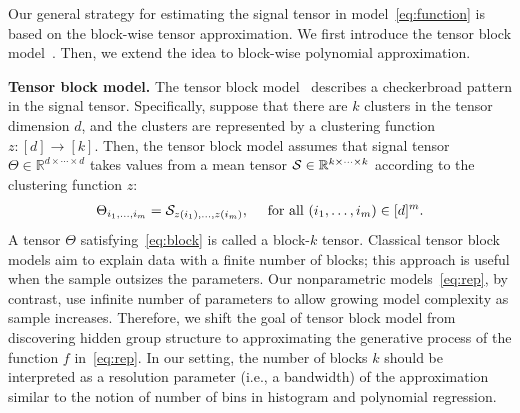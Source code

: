 \documentclass{article}
\theoremstyle{definition}
\begin{document}
Our general strategy for estimating the signal tensor in model~\eqref{eq:function} is based on the block-wise tensor approximation. We first introduce the tensor block model~\citep{han2020exact}. Then, we extend the idea to block-wise polynomial approximation.


{\bf Tensor block model.} The tensor block model~\citep{han2020exact} describes a checkerbroad pattern in the signal tensor. Specifically, suppose that there are $k$ clusters in the tensor dimension $d$, and the clusters are represented by a clustering function $z\colon [d]\rightarrow  [k]$. Then, the tensor block model assumes that signal tensor $\Theta\in\mathbb{R}^{d\times \cdots \times d}$ takes values from a mean tensor $\mathcal{S}\in\mathbb{R}^{k\times\cdots\times k}$ according to the clustering function $z$:
\begin{align}\label{eq:block}
    \Theta_{i_1,\ldots,i_m} = \mathcal{S}_{z(i_1),\ldots,z(i_m)}, \quad \text{ for all } (i_1,\ldots,i_m)\in[d]^m.
\end{align}
A tensor $\Theta$ satisfying~\eqref{eq:block} is called a block-$k$ tensor. 
Classical tensor block models aim to explain data with a finite number of blocks; this approach is useful when the sample outsizes the parameters. Our nonparametric models~\eqref{eq:rep}, by contrast, use infinite number of parameters to allow growing model complexity as sample increases. 
Therefore, we shift the goal of tensor block model from discovering hidden group structure to approximating the generative process of the function $f$ in~\eqref{eq:rep}. In our setting, the number of blocks $k$ should be interpreted as a resolution parameter (i.e., a bandwidth) of the approximation similar to the notion of number of bins in histogram and polynomial regression. 
\end{document}
